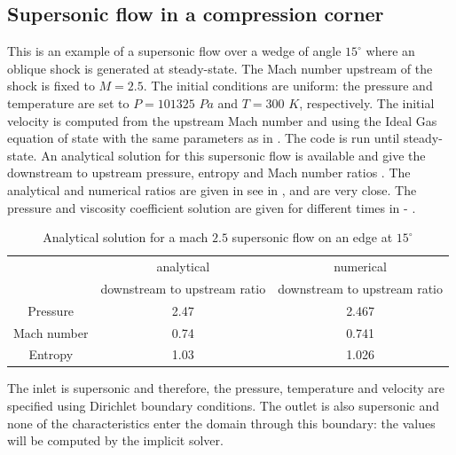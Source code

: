 \subsection{Supersonic flow in a compression corner} \label{sec:corner}
This is an example of a supersonic flow over a wedge of angle $15^{\circ}$ where an oblique shock is generated at steady-state. The Mach number upstream of the shock is fixed to $M=2.5$. The initial conditions are uniform: the pressure and temperature are set to $P=101325$ $Pa$ and $T=300$ $K$, respectively. The initial velocity is computed from the upstream Mach number and using the Ideal Gas equation of state with the same parameters as in . The code is run until steady-state. An analytical solution for this supersonic flow is available and give the downstream to upstream pressure, entropy and Mach number ratios \cite{CompressionCorner}. The analytical and numerical ratios are given in see in , and are very close. The pressure and viscosity coefficient solution are given for different times in  - .
\begin{table}[H]
\begin{center}
 \caption{\label{tbl:corner_exact_sol} Analytical solution for a mach $2.5$ supersonic flow on an edge at $15^{\circ}$}
 \begin{tabular}{|c|c|c|}
 \hline
   & analytical & numerical \\
    & downstream to upstream ratio & downstream to upstream ratio \\
 \hline
Pressure & 2.47 & 2.467\\
  \hline
Mach number  &  0.74 & 0.741\\
   \hline
  Entropy & 1.03 & 1.026\\ \hline 
\end{tabular}
\end{center}
\nonumber
\end{table}
The inlet is supersonic and therefore, the pressure, temperature and velocity are specified using Dirichlet boundary conditions. The outlet is also supersonic and none of the characteristics enter the domain through this boundary: the values will be computed by the implicit solver.
